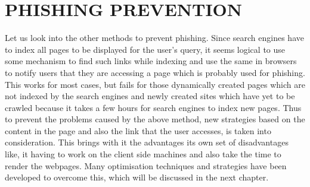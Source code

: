 \section{PHISHING PREVENTION}
Let us look into the other methods to prevent phishing. Since search engines have to index all pages to be displayed for the user’s query, it seems logical to use some mechanism to find such links while indexing and use the same in browsers to notify users that they are accessing a page which is probably used for phishing. This works for most cases, but fails for those dynamically created pages which are not indexed by the search engines and newly created sites which have yet to be crawled because it takes a few hours for search engines to index new pages. 
Thus to prevent the problems caused by the above method, new strategies based on the content in the page and also the link that the user accesses, is taken into consideration. This brings with it the advantages its own set of disadvantages like, it having to work on the client side machines and also take the time to render the webpages. Many optimisation techniques and strategies have been developed to overcome this, which will be discussed in the next chapter.

